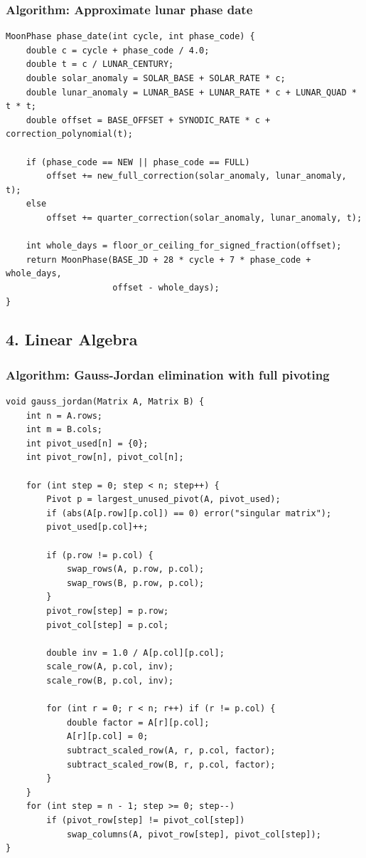 \documentclass[11pt]{article}
\begin{document}
\subsubsection{Algorithm: Approximate lunar phase date}\label{algorithm-approximate-lunar-phase-date}

\begin{verbatim}
MoonPhase phase_date(int cycle, int phase_code) {
    double c = cycle + phase_code / 4.0;
    double t = c / LUNAR_CENTURY;
    double solar_anomaly = SOLAR_BASE + SOLAR_RATE * c;
    double lunar_anomaly = LUNAR_BASE + LUNAR_RATE * c + LUNAR_QUAD * t * t;
    double offset = BASE_OFFSET + SYNODIC_RATE * c + correction_polynomial(t);

    if (phase_code == NEW || phase_code == FULL)
        offset += new_full_correction(solar_anomaly, lunar_anomaly, t);
    else
        offset += quarter_correction(solar_anomaly, lunar_anomaly, t);

    int whole_days = floor_or_ceiling_for_signed_fraction(offset);
    return MoonPhase(BASE_JD + 28 * cycle + 7 * phase_code + whole_days,
                     offset - whole_days);
}
\end{verbatim}

\subsection{4. Linear Algebra}\label{linear-algebra}

\subsubsection{Algorithm: Gauss-Jordan elimination with full pivoting}\label{algorithm-gauss-jordan-elimination-with-full-pivoting}

\begin{verbatim}
void gauss_jordan(Matrix A, Matrix B) {
    int n = A.rows;
    int m = B.cols;
    int pivot_used[n] = {0};
    int pivot_row[n], pivot_col[n];

    for (int step = 0; step < n; step++) {
        Pivot p = largest_unused_pivot(A, pivot_used);
        if (abs(A[p.row][p.col]) == 0) error("singular matrix");
        pivot_used[p.col]++;

        if (p.row != p.col) {
            swap_rows(A, p.row, p.col);
            swap_rows(B, p.row, p.col);
        }
        pivot_row[step] = p.row;
        pivot_col[step] = p.col;

        double inv = 1.0 / A[p.col][p.col];
        scale_row(A, p.col, inv);
        scale_row(B, p.col, inv);

        for (int r = 0; r < n; r++) if (r != p.col) {
            double factor = A[r][p.col];
            A[r][p.col] = 0;
            subtract_scaled_row(A, r, p.col, factor);
            subtract_scaled_row(B, r, p.col, factor);
        }
    }
    for (int step = n - 1; step >= 0; step--)
        if (pivot_row[step] != pivot_col[step])
            swap_columns(A, pivot_row[step], pivot_col[step]);
}
\end{verbatim}
\end{document}
